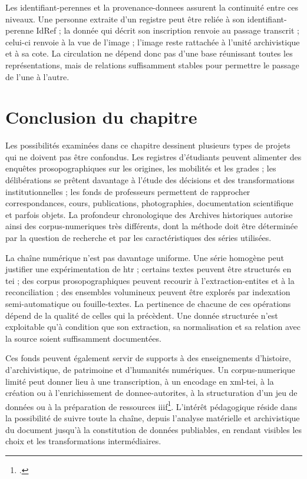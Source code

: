 Les \glspl{identifiant-perenne} et la \gls{provenance-donnees} assurent la continuité entre ces niveaux. Une personne extraite d'un registre peut être reliée à son \gls{identifiant-perenne} IdRef ; la donnée qui décrit son inscription renvoie au passage transcrit ; celui-ci renvoie à la vue de l'image ; l'image reste rattachée à l'unité archivistique et à sa cote. La circulation ne dépend donc pas d'une base réunissant toutes les représentations, mais de relations suffisamment stables pour permettre le passage de l'une à l'autre.



\section*{Conclusion du chapitre}

Les possibilités examinées dans ce chapitre dessinent plusieurs types de projets qui ne doivent pas être confondus. Les registres d'étudiants peuvent alimenter des enquêtes prosopographiques sur les origines, les mobilités et les grades ; les délibérations se prêtent davantage à l'étude des décisions et des transformations institutionnelles ; les fonds de professeurs permettent de rapprocher correspondances, cours, publications, photographies, documentation scientifique et parfois objets. La profondeur chronologique des Archives historiques autorise ainsi des \glspl{corpus-numerique} très différents, dont la méthode doit être déterminée par la question de recherche et par les caractéristiques des séries utilisées.

La chaîne numérique n'est pas davantage uniforme. Une série homogène peut justifier une expérimentation de \gls{htr} ; certains textes peuvent être structurés en \gls{tei} ; des corpus prosopographiques peuvent recourir à l'\gls{extraction-entites} et à la \gls{reconciliation} ; des ensembles volumineux peuvent être explorés par indexation semi-automatique ou \gls{fouille-textes}. La pertinence de chacune de ces opérations dépend de la qualité de celles qui la précèdent. Une donnée structurée n'est exploitable qu'à condition que son extraction, sa normalisation et sa relation avec la source soient suffisamment documentées.

Ces fonds peuvent également servir de supports à des enseignements d'histoire, d'archivistique, de patrimoine et d'humanités numériques. Un \gls{corpus-numerique} limité peut donner lieu à une transcription, à un encodage en \gls{xml}-\gls{tei}, à la création ou à l'enrichissement de \glspl{donnee-autorite}, à la structuration d'un jeu de données ou à la préparation de ressources \gls{iiif}\footcite{SAAACRLPrimarySources2018}. L'intérêt pédagogique réside dans la possibilité de suivre toute la chaîne, depuis l'analyse matérielle et archivistique du document jusqu'à la constitution de données publiables, en rendant visibles les choix et les transformations intermédiaires.

